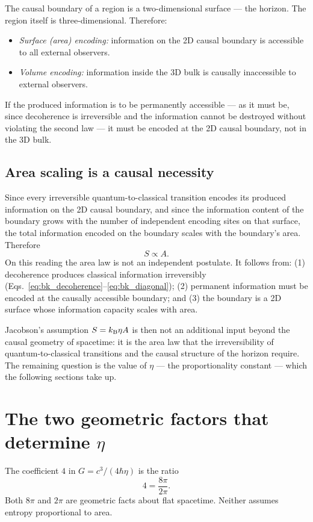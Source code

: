 The causal boundary of a region is a two-dimensional surface --- the horizon. The region itself is three-dimensional. Therefore:
\begin{itemize}
\item \emph{Surface (area) encoding:} information on the 2D causal boundary is accessible to all external observers.
\item \emph{Volume encoding:} information inside the 3D bulk is causally inaccessible to external observers.
\end{itemize}
If the produced information is to be permanently accessible --- as it must be, since decoherence is irreversible and the information cannot be
destroyed without violating the second law --- it must be encoded at the 2D causal boundary, not in the 3D bulk.

\subsection{Area scaling is a causal necessity}
Since every irreversible quantum-to-classical transition encodes its produced information on the 2D causal boundary, and since the information content
of the boundary grows with the number of independent encoding sites on that surface, the total information encoded on the boundary scales with the
boundary's area. Therefore
\begin{equation}
S\propto A.\label{eq:bk_SpropA}
\end{equation}
On this reading the area law is not an independent postulate. It follows from: (1) decoherence produces classical information irreversibly
(Eqs.~\eqref{eq:bk_decoherence}--\eqref{eq:bk_diagonal}); (2) permanent information must be encoded at the causally accessible boundary; and (3) the boundary is a
2D surface whose information capacity scales with area. \interp

Jacobson's assumption $S=k_{\mathrm B}\eta A$ is then not an additional input beyond the causal geometry of spacetime: it is the area law that the
irreversibility of quantum-to-classical transitions and the causal structure of the horizon require. The remaining question is the value of $\eta$ ---
the proportionality constant --- which the following sections take up. \interp

\section{The two geometric factors that determine $\eta$}\label{sec:bk_factors}
The coefficient $4$ in $G=c^3/(4\hbar\eta)$ is the ratio
\begin{equation}
4=\frac{8\pi}{2\pi}.\label{eq:bk_four}
\end{equation}
Both $8\pi$ and $2\pi$ are geometric facts about flat spacetime. Neither assumes entropy proportional to area. \derived{}

